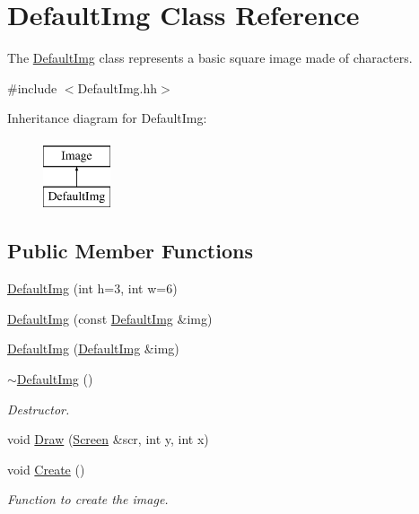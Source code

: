 \hypertarget{classDefaultImg}{\section{Default\-Img Class Reference}
\label{classDefaultImg}
}


The \hyperlink{classDefaultImg}{Default\-Img} class represents a basic square image made of characters.  




{\ttfamily \#include $<$Default\-Img.\-hh$>$}

Inheritance diagram for Default\-Img\-:\begin{figure}[H]
\begin{center}
\leavevmode
\includegraphics[height=2.000000cm]{classDefaultImg}
\end{center}
\end{figure}
\subsection*{Public Member Functions}
\begin{DoxyCompactItemize}
\item 
\hyperlink{classDefaultImg_a09ec4746579dd44736ffa58ca53239c8}{Default\-Img} (int h=3, int w=6)
\item 
\hyperlink{classDefaultImg_a98d6ecfaa4c02eba7b2c58ad0285521e}{Default\-Img} (const \hyperlink{classDefaultImg}{Default\-Img} \&img)
\item 
\hyperlink{classDefaultImg_ad4763b2a674e202d3ea99ceb179bad6a}{Default\-Img} (\hyperlink{classDefaultImg}{Default\-Img} \&img)
\item 
\hypertarget{classDefaultImg_ad3b823ee6222b08a4999802a0dc5ceec}{\hyperlink{classDefaultImg_ad3b823ee6222b08a4999802a0dc5ceec}{$\sim$\-Default\-Img} ()}\label{classDefaultImg_ad3b823ee6222b08a4999802a0dc5ceec}

\begin{DoxyCompactList}\small\item\em Destructor. \end{DoxyCompactList}\item 
void \hyperlink{classDefaultImg_a3a356e422b5575bc9b500d0783fb070c}{Draw} (\hyperlink{classScreen}{Screen} \&scr, int y, int x)
\item 
\hypertarget{classDefaultImg_a9ab21b397e0d23831b2944b651058b89}{void \hyperlink{classDefaultImg_a9ab21b397e0d23831b2944b651058b89}{Create} ()}\label{classDefaultImg_a9ab21b397e0d23831b2944b651058b89}

\begin{DoxyCompactList}\small\item\em Function to create the image. \end{DoxyCompactList}\end{DoxyCompactItemize}
